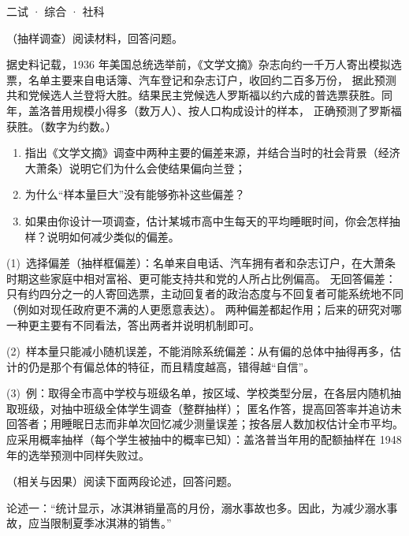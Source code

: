 \documentclass[cjk=noto, seal=first]{mojing-exam}
\begin{document}
\begin{paper}[time={建议 1.5 小时（训练设置）}, full=100]{二试 · 综合 · 社科}
\begin{questions}
\question[25]
（抽样调查）阅读材料，回答问题。

\hspace{2em}据史料记载，1936 年美国总统选举前，《文学文摘》杂志向约一千万人寄出模拟选票，名单主要来自电话簿、汽车登记和杂志订户，收回约二百多万份，
据此预测共和党候选人兰登将大胜。结果民主党候选人罗斯福以约六成的普选票获胜。同年，盖洛普用规模小得多（数万人）、按人口构成设计的样本，
正确预测了罗斯福获胜。（数字为约数。）
\begin{enumerate}
  \item 指出《文学文摘》调查中两种主要的偏差来源，并结合当时的社会背景（经济大萧条）说明它们为什么会使结果偏向兰登；
  \item 为什么“样本量巨大”没有能够弥补这些偏差？
  \item 如果由你设计一项调查，估计某城市高中生每天的平均睡眠时间，你会怎样抽样？说明如何减少类似的偏差。
\end{enumerate}
\answerspace{2cm}
\begin{solution}
(1)~选择偏差（抽样框偏差）：名单来自电话、汽车拥有者和杂志订户，在大萧条时期这些家庭中相对富裕、更可能支持共和党的人所占比例偏高。
无回答偏差：只有约四分之一的人寄回选票，主动回复者的政治态度与不回复者可能系统地不同（例如对现任政府更不满的人更愿意表达）。
两种偏差都起作用；后来的研究对哪一种更主要有不同看法，答出两者并说明机制即可。

(2)~样本量只能减小随机误差，不能消除系统偏差：从有偏的总体中抽得再多，估计的仍是那个有偏总体的特征，而且精度越高，错得越“自信”。

(3)~例：取得全市高中学校与班级名单，按区域、学校类型分层，在各层内随机抽取班级，对抽中班级全体学生调查（整群抽样）；
匿名作答，提高回答率并追访未回答者；用睡眠日志而非单次回忆减少测量误差；按各层人数加权估计全市平均。
应采用概率抽样（每个学生被抽中的概率已知）：盖洛普当年用的配额抽样在 1948 年的选举预测中同样失败过。
\end{solution}

\question[25]
（相关与因果）阅读下面两段论述，回答问题。

\hspace{2em}论述一：“统计显示，冰淇淋销量高的月份，溺水事故也多。因此，为减少溺水事故，应当限制夏季冰淇淋的销售。”


\end{questions}
\end{paper}
\end{document}
